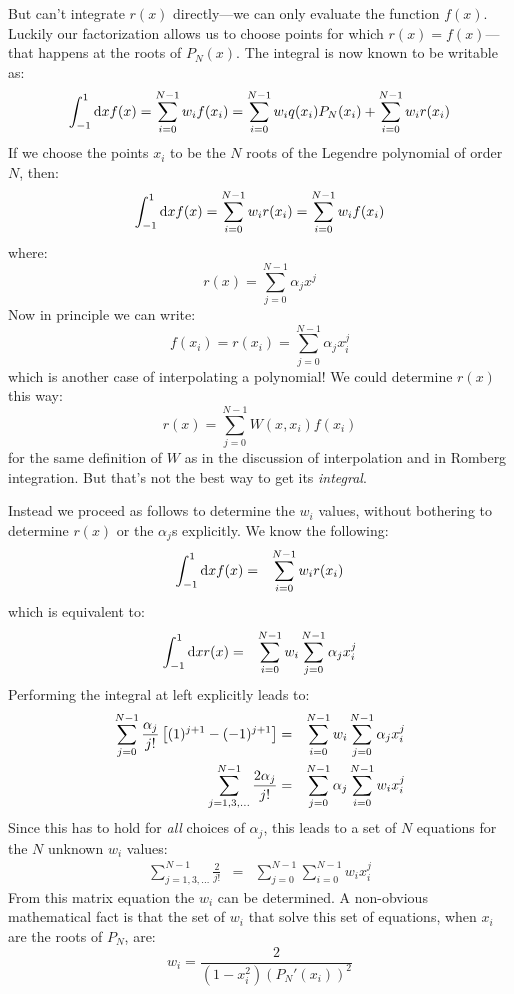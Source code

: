 But can't integrate $r(x)$ directly---we can only evaluate the
function $f(x)$. Luckily our factorization allows us to choose points
for which $r(x)=f(x)$---that happens at the roots of $P_N(x)$. The
integral is now known to be writable as:
\begin{equation}
\int_{-1}^{1} {\rm d}x f(x) = \sum_{i=0}^{N-1} w_i f(x_i) =
\sum_{i=0}^{N-1} w_i q(x_i) P_N(x_i) + 
\sum_{i=0}^{N-1} w_i r(x_i)
\end{equation}
If we choose the points $x_i$ to be the $N$ roots of the Legendre
polynomial of order $N$, then:
\begin{equation}
\int_{-1}^{1} {\rm d}x f(x) = \sum_{i=0}^{N-1} w_i r(x_i)
= \sum_{i=0}^{N-1} w_i f(x_i)
\end{equation}
where:
\begin{equation}
r(x) = \sum_{j=0}^{N-1} \alpha_j x^j
\end{equation}
Now in principle we can write:
\begin{equation}
f(x_i) = r(x_i) = \sum_{j=0}^{N-1} \alpha_j x_i^j
\end{equation}
which is another case of interpolating a polynomial! We could
determine $r(x)$ this way:
\begin{equation}
r(x) = \sum_{j=0}^{N-1} W(x, x_i) f(x_i)
\end{equation}
for the same definition of $W$ as in the discussion of interpolation
and in Romberg integration. But that's not the best way to get its
{\it integral}. 

Instead we proceed as follows to determine the $w_i$ values, without
bothering to determine $r(x)$ or the $\alpha_j$s explicitly. We know
the following:
\begin{eqnarray}
\int_{-1}^{1} {\rm d}x f(x) &=& \sum_{i=0}^{N-1} w_i r(x_i)
\end{eqnarray}
which is equivalent to:
\begin{eqnarray}
\int_{-1}^{1} {\rm d}x r(x) &=& \sum_{i=0}^{N-1} w_i
\sum_{j=0}^{N-1} \alpha_{j} x_i^{j}
\end{eqnarray}
Performing the integral at left explicitly leads to:
\begin{eqnarray}
\sum_{j=0}^{N-1} \frac{\alpha_j}{j!} \left[(1)^{j+1} -
(-1)^{j+1}\right] &=& \sum_{i=0}^{N-1} w_i 
\sum_{j=0}^{N-1} \alpha_{j} x_i^{j}\cr
\sum_{j=1,3,\ldots}^{N-1} \frac{2 \alpha_j}{j!} &=&
\sum_{{j}=0}^{N-1}
\alpha_{j}
\sum_{i=0}^{N-1} w_i 
x_i^{j}
\end{eqnarray}
Since this has to hold for {\it all} choices of $\alpha_j$, this leads
to a set of $N$ equations for the $N$ unknown $w_i$ values:
\begin{eqnarray}
\sum_{j=1,3,\ldots}^{N-1} \frac{2}{j!} &=&
\sum_{{j}=0}^{N-1}
\sum_{i=0}^{N-1} w_i 
x_i^{j}
\end{eqnarray}
From this matrix equation the $w_i$ can be determined. A non-obvious
mathematical fact is that the set of $w_i$ that solve this set of
equations, when $x_i$ are the roots of $P_N$, are:
\begin{equation}
w_i = \frac{2}{\left(1-x_i^2\right) \left(P_N'(x_i)\right)^2}
\end{equation}

